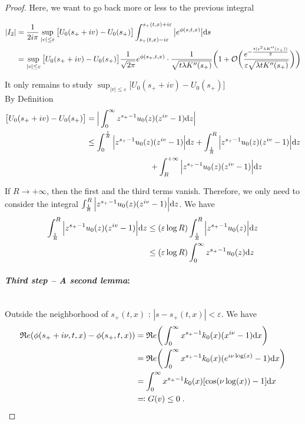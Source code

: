 \documentclass[11pt]{amsart}
\renewcommand{\Re}{\mathfrak{R}e}
\begin{document}
\begin{proof}
Here, we want to go back more or less to the previous integral

    \begin{align*}
         |I_2| 
         &= 
         \frac{1}{2i \pi} \sup_{|v| \leq \varepsilon} \big[U_0(s_+ + iv) -  U_0(s_+) \big] \int_{s_+(t,x) - i\varepsilon}^{s_+(t,x) + i\varepsilon} \big| e^{\phi(s,t,x)} \big| \mathrm ds \\
         &=
         \sup_{|v| \leq \varepsilon} \big[U_0(s_+ + iv) -  U_0(s_+) \big] \frac{1}{\sqrt{2\pi}} e^{\phi(s_+, t, x)} \cdot \frac{1}{\sqrt{t \lambda K''(s_+)}} \bigg( 
    1 + \mathcal{O}\bigg(\frac{e^{-\frac{t(\varepsilon^2 \lambda K''(s_+))}{2}} }{\varepsilon \sqrt{\lambda tK''(s_+)}}\bigg) \bigg)
    \end{align*}
    
It only remains to study $  \sup_{|v| \leq \varepsilon} \big[U_0(s_+ + iv) -  U_0(s_+) \big]$ \\

By Definition
\begin{align*}
    \big[U_0(s_+ + iv) -  U_0(s_+) \big]
    &= \Big| \int_0^\infty  z^{s_+ - 1}u_0(z) (z^{iv} - 1) \mathrm dz \Big| \\
    &\leq \int_0^{\frac{1}{R}} \Big|  z^{s_+ - 1}u_0(z) (z^{iv} - 1) \Big| \mathrm dz
        + \int_{\frac{1}{R}}^R \Big|  z^{s_+ - 1}u_0(z) (z^{iv} - 1) \Big| \mathrm dz \\
        &\qquad \qquad \qquad \qquad
        + \int_R^{+\infty} \Big|  z^{s_+ - 1}u_0(z) (z^{iv} - 1) \Big| \mathrm dz \\
\end{align*}

If $R \to + \infty$, then the first and the third terms vanish. Therefore, we only need to consider the integral $ \int_{\frac{1}{R}}^R \Big|  z^{s_+ - 1}u_0(z) (z^{iv} - 1) \Big| \mathrm dz$. We have
    \begin{align*}
         \int_{\frac{1}{R}}^R \Big|  z^{s_+ - 1}u_0(z) (z^{iv} - 1) \Big| \mathrm dz 
         &\leq 
          (\varepsilon \log R)\int_{\frac{1}{R}}^R \Big|  z^{s_+ - 1}u_0(z) \Big| \mathrm dz \\
         &\leq 
          (\varepsilon \log R)\int_{0}^{\infty} z^{s_+ - 1}u_0(z)  \mathrm dz \\
    \end{align*}

\medskip
\paragraph{\textit{Third step -- A second lemma}:}\mbox{}\\
Outside the neighborhood of $s_+(t,x)$ : $|s - s_+(t,x)| < \varepsilon$. We have
\begin{align*}
    \Re(\phi(s_+ + i \nu, t, x) - \phi(s_+, t, x)) 
    &=
    \Re \bigg( \int_0^\infty x^{s_+ - 1}k_0(x) (x^{i\nu} - 1) \dx \bigg) \\
    &=
    \Re \bigg( \int_0^\infty x^{s_+ - 1}k_0(x) (e^{i\nu \log(x)}- 1) \dx \bigg) \\ 
    &= 
    \int_0^\infty x^{s_+ - 1}k_0(x) [\cos(\nu \log(x))- 1] \dx  \\
    &\eqqcolon G(v) \leq 0
    \eqfinp
\end{align*}


\end{proof}
\end{document}
